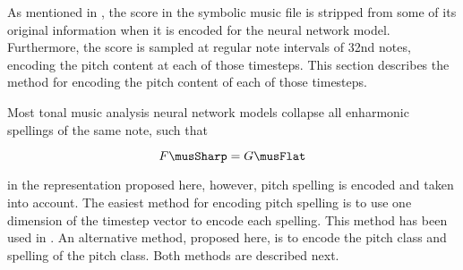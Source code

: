
As mentioned in , the score in
the symbolic music file is stripped from some of its
original information when it is encoded for the neural
network model. Furthermore, the score is sampled at regular
note intervals of 32nd notes, encoding the pitch content at
each of those timesteps. This section describes the method
for encoding the pitch content of each of those timesteps. 

Most tonal music analysis neural network models collapse all
enharmonic spellings of the same note, such that 

$$F\musSharp = G\musFlat$$

in the representation proposed here, however, pitch spelling
is encoded and taken into account. The easiest method for
encoding pitch spelling is to use one dimension of the
timestep vector to encode each spelling. This method has
been used in \textcite{micchi2020not, micchi2021deep}. An
alternative method, proposed here, is to encode the pitch
class and spelling of the pitch class. Both methods are
described next.
